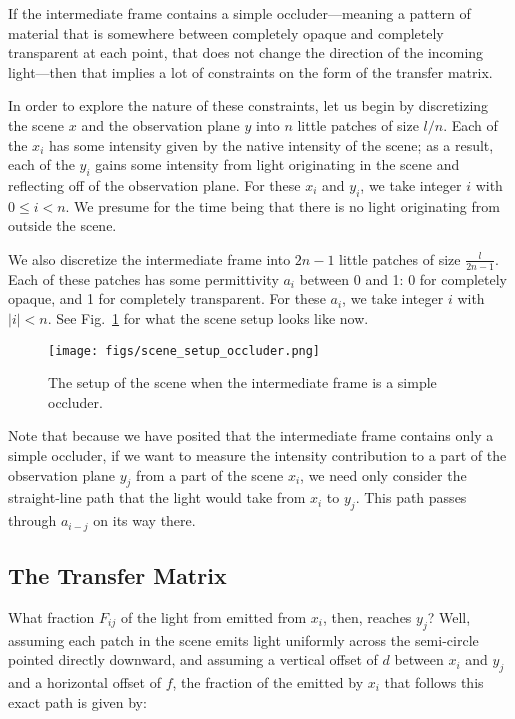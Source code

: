 \documentclass[11pt]{article}
\begin{document}
If the intermediate frame contains a simple occluder---meaning a pattern of material that is somewhere between completely opaque and completely transparent at each point, that does not change the direction of the incoming light---then that implies a lot of constraints on the form of the transfer matrix.

In order to explore the nature of these constraints, let us begin by discretizing the scene $x$ and the observation plane $y$ into $n$ little patches of size $l/n$. Each of the $x_i$ has some intensity given by the native intensity of the scene; as a result, each of the $y_i$ gains some intensity from light originating in the scene and reflecting off of the observation plane. For these $x_i$ and $y_i$, we take integer $i$ with $0 \le i < n$. We presume for the time being that there is no light originating from outside the scene.

We also discretize the intermediate frame into $2n - 1$ little patches of size $\frac{l}{2n-1}$. Each of these patches has some permittivity $a_i$ between 0 and 1: 0 for completely opaque, and 1 for completely transparent. For these $a_i$, we take integer $i$ with $|i| < n$. See Fig.~\ref{fig:scene_setup_occluder} for what the scene setup looks like now.

\begin{figure}
\centering
\texttt{[image: figs/scene\_setup\_occluder.png]}
\caption{The setup of the scene when the intermediate frame is a simple occluder.}
\label{fig:scene_setup_occluder}
\end{figure}

Note that because we have posited that the intermediate frame contains only a simple occluder, if we want to measure the intensity contribution to a part of the observation plane $y_j$ from a part of the scene $x_i$, we need only consider the straight-line path that the light would take from $x_i$ to $y_j$. This path passes through $a_{i-j}$ on its way there.

\subsection{The Transfer Matrix}

What fraction $F_{ij}$ of the light from emitted from $x_i$, then, reaches $y_j$? Well, assuming each patch in the scene emits light uniformly across the semi-circle pointed directly downward, and assuming a vertical offset of $d$ between $x_i$ and $y_j$ and a horizontal offset of $f$, the fraction of the emitted by $x_i$ that follows this exact path is given by:
\end{document}
